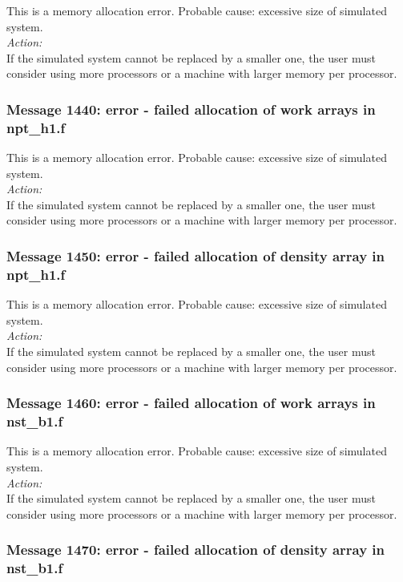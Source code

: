 This is a memory allocation error. Probable cause: excessive size of
simulated system. \\

\noindent
{\em Action:}\\
If the simulated system cannot be replaced by a smaller one, the user
must consider using more processors or a machine with larger memory
per processor.

\subsubsection*{Message 1440: error - failed allocation of work arrays
in npt\_h1.f}

This is a memory allocation error. Probable cause: excessive size of
simulated system. \\

\noindent
{\em Action:}\\
If the simulated system cannot be replaced by a smaller one, the user
must consider using more processors or a machine with larger memory
per processor.

\subsubsection*{Message 1450: error - failed allocation of density
array in npt\_h1.f}

This is a memory allocation error. Probable cause: excessive size of
simulated system. \\

\noindent
{\em Action:}\\
If the simulated system cannot be replaced by a smaller one, the user
must consider using more processors or a machine with larger memory
per processor.

\subsubsection*{Message 1460: error - failed allocation of work arrays
in nst\_b1.f}

This is a memory allocation error. Probable cause: excessive size of
simulated system. \\

\noindent
{\em Action:}\\
If the simulated system cannot be replaced by a smaller one, the user
must consider using more processors or a machine with larger memory
per processor.

\subsubsection*{Message 1470: error - failed allocation of density
array in nst\_b1.f}

